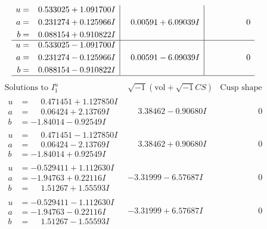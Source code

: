 \documentclass[1p]{elsarticle_modified}
\theoremstyle{definition}
\newcommand{\I}{\sqrt{-1}}
\begin{document}
$$\begin{array}{c|c|c}
\begin{aligned}
u &= \phantom{-}0.533025 + 1.091700 I \\
a &= \phantom{-}0.231274 + 0.125966 I \\
b &= \phantom{-}0.088154 + 0.910822 I\end{aligned}
 & \phantom{-}0.00591 + 6.09039 I & \phantom{-0.000000 } 0 \\ \hline\begin{aligned}
u &= \phantom{-}0.533025 - 1.091700 I \\
a &= \phantom{-}0.231274 - 0.125966 I \\
b &= \phantom{-}0.088154 - 0.910822 I\end{aligned}
 & \phantom{-}0.00591 - 6.09039 I & \phantom{-0.000000 } 0\\
 \hline 
 \end{array}$$\newpage$$\begin{array}{c|c|c}  
\text{Solutions to }I^u_{1}& \I (\text{vol} + \sqrt{-1}CS) & \text{Cusp shape}\\
 \hline 
\begin{aligned}
u &= \phantom{-}0.471451 + 1.127850 I \\
a &= \phantom{-}0.06424 + 2.13769 I \\
b &= -1.84014 - 0.92549 I\end{aligned}
 & \phantom{-}3.38462 - 0.90680 I & \phantom{-0.000000 } 0 \\ \hline\begin{aligned}
u &= \phantom{-}0.471451 - 1.127850 I \\
a &= \phantom{-}0.06424 - 2.13769 I \\
b &= -1.84014 + 0.92549 I\end{aligned}
 & \phantom{-}3.38462 + 0.90680 I & \phantom{-0.000000 } 0 \\ \hline\begin{aligned}
u &= -0.529411 + 1.112630 I \\
a &= -1.94763 + 0.22116 I \\
b &= \phantom{-}1.51267 + 1.55593 I\end{aligned}
 & -3.31999 - 6.57687 I & \phantom{-0.000000 } 0 \\ \hline\begin{aligned}
u &= -0.529411 - 1.112630 I \\
a &= -1.94763 - 0.22116 I \\
b &= \phantom{-}1.51267 - 1.55593 I\end{aligned}
 & -3.31999 + 6.57687 I & \phantom{-0.000000 } 0 \\ \hline\begin{aligned}

\end{aligned}
\end{array}$$
\end{document}
